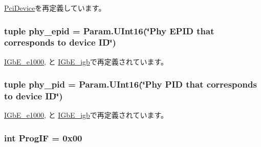 \hyperlink{classPci_1_1PciDevice_a00f14447f8246b8b6a86c550185caddc}{PciDevice}を再定義しています。\hypertarget{classEthernet_1_1IGbE_aa5410782903449f47b14de3c73f6cb49}{
\subsubsection[{phy\_\-epid}]{\setlength{\rightskip}{0pt plus 5cm}tuple {\bf phy\_\-epid} = Param.UInt16(\char`\"{}Phy EPID that corresponds to device ID\char`\"{})}}
\label{classEthernet_1_1IGbE_aa5410782903449f47b14de3c73f6cb49}


\hyperlink{classEthernet_1_1IGbE__e1000_a5bb971e985d09a29903843736a36c7d8}{IGbE\_\-e1000}, と \hyperlink{classEthernet_1_1IGbE__igb_a5bb971e985d09a29903843736a36c7d8}{IGbE\_\-igb}で再定義されています。\hypertarget{classEthernet_1_1IGbE_a3cdba89a4899636d7e18cc917992ca1d}{
\subsubsection[{phy\_\-pid}]{\setlength{\rightskip}{0pt plus 5cm}tuple {\bf phy\_\-pid} = Param.UInt16(\char`\"{}Phy PID that corresponds to device ID\char`\"{})}}
\label{classEthernet_1_1IGbE_a3cdba89a4899636d7e18cc917992ca1d}


\hyperlink{classEthernet_1_1IGbE__e1000_a229cca8e73c20d1d9c9089d20967f7fa}{IGbE\_\-e1000}, と \hyperlink{classEthernet_1_1IGbE__igb_a229cca8e73c20d1d9c9089d20967f7fa}{IGbE\_\-igb}で再定義されています。\hypertarget{classEthernet_1_1IGbE_aa63e82532e33e89795f472cfb7e0bb67}{
\subsubsection[{ProgIF}]{\setlength{\rightskip}{0pt plus 5cm}int {\bf ProgIF} = 0x00}}
\label{classEthernet_1_1IGbE_aa63e82532e33e89795f472cfb7e0bb67}


